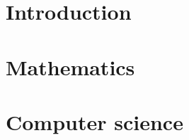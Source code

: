 \documentclass[ twoside,openright,titlepage,numbers=noenddot,headinclude,%
                footinclude=true,cleardoublepage=empty,abstractoff, %
                BCOR=5mm,paper=a4,fontsize=11pt,%
                ngerman,american,%
                ]{scrreprt}
\begin{document}
    \frenchspacing
    \raggedbottom
    \pagestyle{plain}

    
    
    \cleardoublepage
    \cleardoublepage
    \cleardoublepage
    \pagestyle{scrheadings}
    \cleardoublepage

    \cleardoublepage{}
    \cleardoublepage


	\listoftodos[To do list]
	
	\part{Introduction}
	
    \part{Mathematics}
    
    
    
    
    
    
    
    \part{Computer science}
    
    
    
    
    
    
\end{document}
